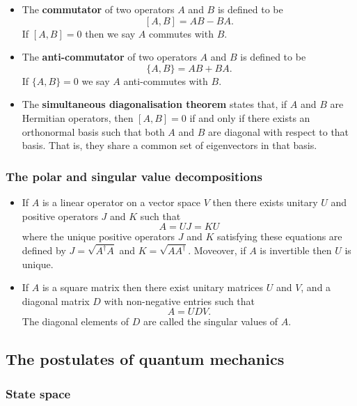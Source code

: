 \documentclass{article}
\begin{document}
\begin{itemize}
  \item The \textbf{commutator} of two operators $A$ and $B$ is defined to be \[[A, B] = A B - B A.\] If $[A, B] = 0$ then we say $A$ commutes with $B$.

  \item The \textbf{anti-commutator} of two operators $A$ and $B$ is defined to be \[\{A, B\} = A B + B A.\] If $\{A, B\} = 0$ we say $A$ anti-commutes with $B$.

  \item The \textbf{simultaneous diagonalisation theorem} states that, if $A$ and $B$ are Hermitian operators, then $[A, B] = 0$ if and only if there exists an orthonormal basis such that both $A$ and $B$ are diagonal with respect to that basis. That is, they share a common set of eigenvectors in that basis.
\end{itemize}

\subsubsection{The polar and singular value decompositions}

\begin{itemize}
  \item If $A$ is a linear operator on a vector space $V$ then there exists unitary $U$ and positive operators $J$ and $K$ such that \[A = U J = K U\] where the unique positive operators $J$ and $K$ satisfying these equations are defined by $J = \sqrt{A^\dag A}$ and $K = \sqrt{A A^\dag}$. Moveover, if $A$ is invertible then $U$ is unique.

  \item If $A$ is a square matrix then there exist unitary matrices $U$ and $V$, and a diagonal matrix $D$ with non-negative entries such that \[A = U D V.\] The diagonal elements of $D$ are called the singular values of $A$.
\end{itemize}

\subsection{The postulates of quantum mechanics}

\subsubsection{State space}
\end{document}
